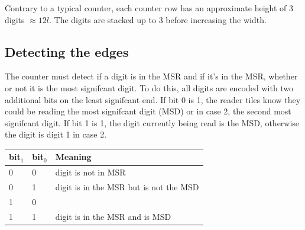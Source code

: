 Contrary to a typical counter, each counter row has an approximate height of 3 digits $\approx 12l$.
The digits are stacked up to 3 before increasing the width.

\subsection{ Detecting the edges }

The counter must detect if a digit is in the MSR and if it's in the MSR, whether or not it is the most
signifcant digit. To do this, all digits are encoded with two additional bits on the least signifcant end.
If bit 0 is 1, the reader tiles know they could be reading the most signifcant digit (MSD) or in case 2, the
second most signifcant digit. If bit 1 is 1, the digit currently being read is the MSD, otherwise
the digit is digit 1 in case 2.

\begin{table}[H]
    \begin{tabular}{|l|l|l|}
    \hline
        bit$_1$ & bit$_0$ & Meaning                                \\ \hline
            0   & 0       & digit is not in MSR                    \\ \hline
            0   & 1       & digit is in the MSR but is not the MSD \\ \hline
            1   & 0       &                                        \\ \hline
            1   & 1       & digit is in the MSR and is MSD         \\ \hline
    \end{tabular}
\end{table}